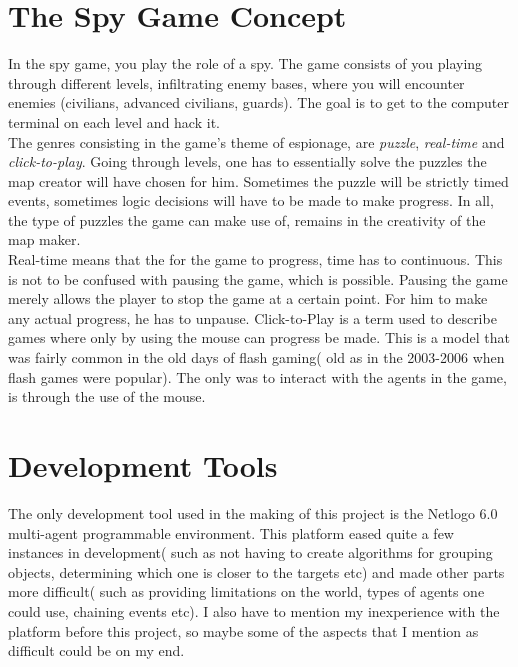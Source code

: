 \documentclass[12pt]{article}
\begin{document}
\newpage
\tableofcontents
\newpage
\pagestyle{plain}
\setcounter{page}{1}
\section{The Spy Game Concept}
\begin{normalsize}
In the spy game, you play the role of a spy. The game consists of you playing through different levels, infiltrating enemy bases, where you will encounter enemies (civilians, advanced civilians, guards). The goal is to get to the computer terminal on each level and hack it.\\
The genres consisting in the game's theme of espionage, are \emph{puzzle}, \emph{real-time} and \emph{click-to-play}.
Going through levels, one has to essentially solve the puzzles the map creator will have chosen for him. Sometimes the puzzle will be strictly timed events, sometimes logic decisions will have to be made to make progress. In all, the type of puzzles the game can make use of, remains in the creativity of the map maker.\\
Real-time means that the for the game to progress, time has to continuous. This is not to be confused with pausing the game, which is possible. Pausing the game merely allows the player to stop the game at a certain point. For him to make any actual progress, he has to unpause.
Click-to-Play is a term used to describe games where only by using the mouse can progress be made. This is a model that was fairly common in the old days of flash gaming( old as in the 2003-2006 when flash games were popular). The only was to interact with the agents in the game, is through the use of the mouse.
\end{normalsize}
\section{Development Tools}
The only development tool used in the making of this project is the Netlogo 6.0 multi-agent programmable environment. This platform eased quite a few instances in development( such as not having to create algorithms for grouping objects, determining which one is closer to the targets etc) and made other parts more difficult( such as providing limitations on the world, types of agents one could use, chaining events etc). I also have to mention my inexperience with the platform before this project, so maybe some of the aspects that I mention as difficult could be on my end.
\newpage
\end{document}
